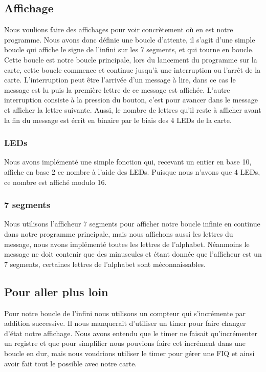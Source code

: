 \documentclass[a4paper, 10pt]{article}
\begin{document}
\subsection{Affichage}

Nous voulions faire des affichages pour voir concrètement où en est notre programme. Nous avons donc définie une boucle d'attente, il s'agit d'une simple boucle qui affiche le signe de l'infini sur les 7 segments, et qui tourne en boucle. Cette boucle est notre boucle principale, lors du lancement du programme sur la carte, cette boucle commence et continue jusqu'à une interruption ou l'arrêt de la carte. L'interruption peut être l'arrivée d'un message à lire, dans ce cas le message est lu puis la première lettre de ce message est affichée. L'autre interruption consiste à la pression du bouton, c'est pour avancer dans le message et afficher la lettre suivante. Aussi, le nombre de lettres qu'il reste à afficher avant la fin du message est écrit en binaire par le biais des 4 LEDs de la carte.

\subsubsection{LEDs}

Nous avons implémenté une simple fonction qui, recevant un entier en base 10, affiche en base 2 ce nombre à l'aide des LEDs. Puisque nous n'avons que 4 LEDs, ce nombre est affiché modulo 16.

\subsubsection{7 segments}

Nous utilisons l'afficheur 7 segments pour afficher notre boucle infinie en continue dans notre programme principale, mais nous affichons aussi les lettres du message, nous avons implémenté toutes les lettres de l'alphabet. Néanmoins le message ne doit contenir que des minuscules et étant donnée que l'afficheur est un 7 segments, certaines lettres de l'alphabet sont méconnaissables.

\subsection{Pour aller plus loin}

Pour notre boucle de l'infini nous utilisons un compteur qui s'incrémente par addition successive. Il nous manquerait d'utiliser un timer pour faire changer d'état notre affichage. Nous avons entendu que le timer ne faisait qu'incrémenter un registre et que pour simplifier nous pouvions faire cet incrément dans une boucle en dur, mais nous voudrions utiliser le timer pour gérer une FIQ et ainsi avoir fait tout le possible avec notre carte.
\end{document}
